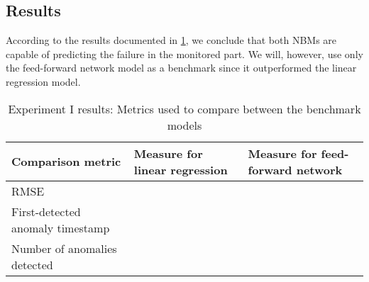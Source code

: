 \subsection{Results}
According to the results documented in \ref{tab:Experiment I results}, we conclude that both NBMs are capable of predicting the failure in the monitored part. We will, however, use only the feed-forward network model as a benchmark since it outperformed the linear regression model.
\begin{table}[H]
        \centering
    \begin{tabular}{|m{4cm}|m{4cm}|m{4cm}|}
    \hline
         \textbf{Comparison metric} & \textbf{Measure for linear regression}   & \textbf{Measure for feed-forward network}\\
         \hline
         RMSE & & \\
         \hline
         First-detected anomaly timestamp & & \\
         \hline
         Number of anomalies detected & & \\
         \hline
    \hline
    \end{tabular}
    \caption{Experiment I results: Metrics used to compare between the benchmark models}
        \label{tab:Experiment I results}
\end{table}